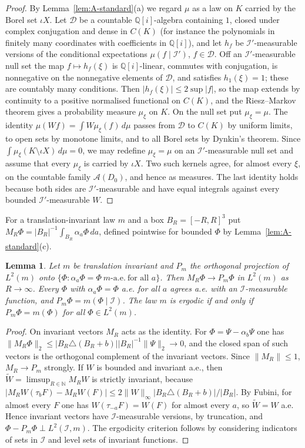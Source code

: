 \documentclass[11pt]{amsart}
\theoremstyle{plain}
\newtheorem{lemma}[theorem]{Lemma}
\theoremstyle{definition}
\theoremstyle{remark}
\numberwithin{equation}{section}
\newcommand{\N}{\mathbb{N}}
\newcommand{\Q}{\mathbb{Q}}
\newcommand{\cA}{\mathcal{A}}
\newcommand{\cD}{\mathcal{D}}
\newcommand{\cI}{\mathcal{I}}
\newcommand{\abs}[1]{\lvert #1\rvert}
\newcommand{\norm}[1]{\lVert #1\rVert}
\begin{document}
\begin{proof}
By Lemma~\ref{lem:A-standard}(a) we regard $\mu$ as a law on $K$ carried by the Borel set $\iota X$. Let $\cD$ be a countable $\Q[i]$-algebra containing $1$, closed under complex conjugation and dense in $C(K)$ (for instance the polynomials in finitely many coordinates with coefficients in $\Q[i]$), and let $h_f$ be $\cI'$-measurable versions of the conditional expectations $\mu(f\mid\cI')$, $f\in\cD$. Off an $\cI'$-measurable null set the map $f\mapsto h_f(\xi)$ is $\Q[i]$-linear, commutes with conjugation, is nonnegative on the nonnegative elements of $\cD$, and satisfies $h_1(\xi)=1$; these are countably many conditions. Then $\abs{h_f(\xi)}\le2\sup\abs f$, so the map extends by continuity to a positive normalised functional on $C(K)$, and the Riesz--Markov theorem gives a probability measure $\mu_\xi$ on $K$. On the null set put $\mu_\xi=\mu$. The identity $\mu(Wf)=\int W\mu_\xi(f)\,d\mu$ passes from $\cD$ to $C(K)$ by uniform limits, to open sets by monotone limits, and to all Borel sets by Dynkin's theorem. Since $\int\mu_\xi(K\setminus\iota X)\,d\mu=0$, we may redefine $\mu_\xi=\mu$ on an $\cI'$-measurable null set and assume that every $\mu_\xi$ is carried by $\iota X$. Two such kernels agree, for almost every $\xi$, on the countable family $\cA(D_0)$, and hence as measures. The last identity holds because both sides are $\cI'$-measurable and have equal integrals against every bounded $\cI'$-measurable $W$.
\end{proof}

For a translation-invariant law $m$ and a box $B_R=[-R,R]^3$ put $M_R\Phi=\abs{B_R}^{-1}\int_{B_R}\alpha_a\Phi\,da$, defined pointwise for bounded $\Phi$ by Lemma~\ref{lem:A-standard}(c).

\begin{lemma}\label{lem:A-mean}
Let $m$ be translation invariant and $P_m$ the orthogonal projection of $L^2(m)$ onto $\{\Phi:\alpha_a\Phi=\Phi\ m\text{-a.e.}\ \text{for all }a\}$. Then $M_R\Phi\to P_m\Phi$ in $L^2(m)$ as $R\to\infty$. Every $\Phi$ with $\alpha_a\Phi=\Phi$ a.e. for all $a$ agrees a.e. with an $\cI$-measurable function, and $P_m\Phi=m(\Phi\mid\cI)$. The law $m$ is ergodic if and only if $P_m\Phi=m(\Phi)$ for all $\Phi\in L^2(m)$.
\end{lemma}

\begin{proof}
On invariant vectors $M_R$ acts as the identity. For $\Phi=\Psi-\alpha_b\Psi$ one has $\norm{M_R\Phi}_2\le\abs{B_R\triangle(B_R+b)}\abs{B_R}^{-1}\norm\Psi_2\to0$, and the closed span of such vectors is the orthogonal complement of the invariant vectors. Since $\norm{M_R}\le1$, $M_R\to P_m$ strongly. If $W$ is bounded and invariant a.e., then $\tilde W=\limsup_{R\in\N}M_RW$ is strictly invariant, because $\abs{M_RW(\tau_bF)-M_RW(F)}\le2\norm W_\infty\abs{B_R\triangle(B_R+b)}/\abs{B_R}$. By Fubini, for almost every $F$ one has $W(\tau_{-a}F)=W(F)$ for almost every $a$, so $\tilde W=W$ a.e. Hence invariant vectors have $\cI$-measurable versions, by truncation, and $\Phi-P_m\Phi\perp L^2(\cI,m)$. The ergodicity criterion follows by considering indicators of sets in $\cI$ and level sets of invariant functions.
\end{proof}
\end{document}
